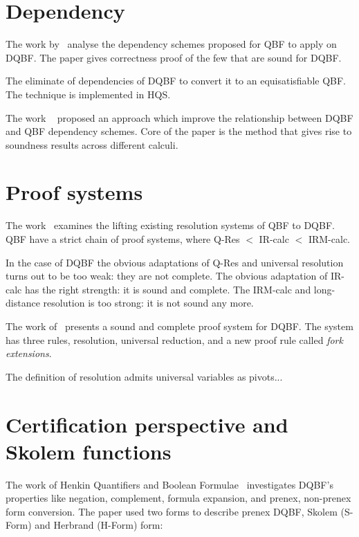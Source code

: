 \documentclass{article}
\begin{document}
\section{Dependency}
The work by~\cite{wimmer2016dependency} analyse the dependency
schemes proposed for QBF to apply on DQBF. 
%
The paper gives correctness proof of the few that are sound for DQBF. 
%

The \cite{wimmer2017dqbf} eliminate of dependencies of DQBF to convert it to an equisatisfiable QBF.
%
The technique is implemented in HQS.



The work ~\cite{beyersdorff2018reinterpreting} proposed an approach which improve the relationship between DQBF and QBF
dependency schemes.
%
Core of the paper is the method that gives rise to soundness results across different calculi.

\section{Proof systems}
The work~\cite{beyersdorff2016lifting} examines the lifting existing resolution systems of QBF to DQBF.
%
QBF have a strict chain of proof systems, where Q-Res $<$ IR-calc $<$ IRM-calc.
%

In the case of DQBF the obvious adaptations of Q-Res and universal resolution turns out to be too weak: they are not complete. 
%
The obvious adaptation of IR-calc has
the right strength: it is sound and complete. 
%
The IRM-calc and long-distance resolution is too strong: it is not sound any more.

The work of~\cite{rabe2017resolution} presents a sound and complete proof system for DQBF.
%
The system has three rules, resolution, universal reduction, and a new proof rule called \textit{fork extensions}.

The definition of resolution admits universal variables as pivots...

\section{Certification perspective and Skolem functions}

The work of Henkin Quantifiers and Boolean Formulae~\cite{balabanov2012henkin} investigates DQBF's properties like negation, complement, formula expansion, and prenex, non-prenex form conversion. 
%
The paper used two forms to describe prenex DQBF, Skolem (S-Form) and Herbrand (H-Form) form:
\end{document}
